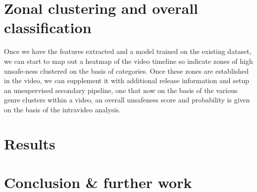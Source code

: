 \documentclass{article}
\begin{document}
\section{Zonal clustering and overall classification}

Once we have the features extracted and a model trained on the existing dataset, we can start to map out a
heatmap of the video timeline so indicate zones of high unsafe-ness clustered on the basis of categories.
Once these zones are established in the video, we can supplement it with additional release information
and setup an unsupervised secondary pipeline, one that now on the basis of the various genre clusters within a video,
an overall unsafeness score and probability is given on the basis of the intravideo analysis.


\section{Results}


\section{Conclusion \& further work}




\end{document}

